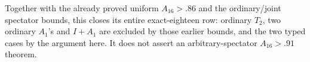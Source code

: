 Together with the already proved uniform \(A_{16}>.86\) and the
ordinary/joint spectator bounds, this closes its entire exact-eighteen
row: ordinary \(T_2\), two ordinary \(A_1\)'s and \(I+A_1\)
are excluded by those earlier bounds, and the two typed cases by the
argument here.  It does not assert an arbitrary-spectator
\(A_{16}>.91\) theorem.
